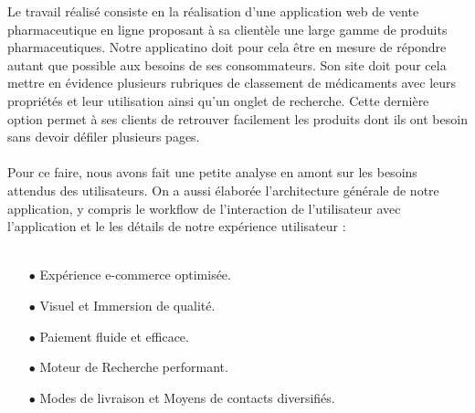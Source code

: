 Le travail réalisé consiste en la réalisation d’une application web de vente pharmaceutique en ligne proposant à sa clientèle une large gamme de produits pharmaceutiques. Notre applicatino doit pour cela être en mesure de répondre autant que possible aux besoins de ses consommateurs. Son site doit pour cela mettre en évidence plusieurs rubriques de classement de médicaments avec leurs propriétés et leur utilisation ainsi qu’un onglet de recherche. Cette dernière option permet à ses clients de retrouver facilement les produits dont ils ont besoin sans devoir défiler plusieurs pages.
\\ \\
Pour ce faire, nous avons fait une petite analyse en amont sur les besoins attendus des utilisateurs. On a aussi élaborée l’architecture générale de notre application, y compris le workflow de l’interaction de l’utilisateur avec l’application et le les détails de notre expérience utilisateur :
\\ \\
\begin{itemize}
    \item[$\bullet$] Expérience e-commerce optimisée.
    \item[$\bullet$] Visuel et Immersion de qualité.
    \item[$\bullet$] Paiement fluide et efficace.
    \item[$\bullet$] Moteur de Recherche performant.
    \item[$\bullet$] Modes de livraison et Moyens de contacts diversifiés.
\end{itemize}
